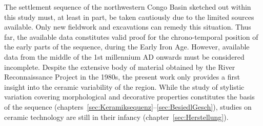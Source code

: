 \begin{multicols}{2}
The settlement sequence of the northwestern Congo Basin sketched out within this study must, at least in part, be taken cautiously due to the limited sources available. Only new fieldwork and excavations can remedy this situation. Thus far, the available data constitutes valid proof for the chrono-temporal position of the early parts of the sequence, during the Early Iron Age. However, available data from the middle of the 1st millennium AD onwards must be considered incomplete. Despite the extensive body of material obtained by the River Reconnaissance Project in the 1980s, the present work only provides a first insight into the ceramic variability of the region. While the study of stylistic variation covering morphological and decorative properties constitutes the basis of the sequence (chapters~\ref{sec:Keramiksequenz}--\ref{sec:BesiedlGesch}), studies on ceramic technology are still in their infancy (chapter~\ref{sec:Herstellung}).
\end{multicols}

\vspace{1.5em}

